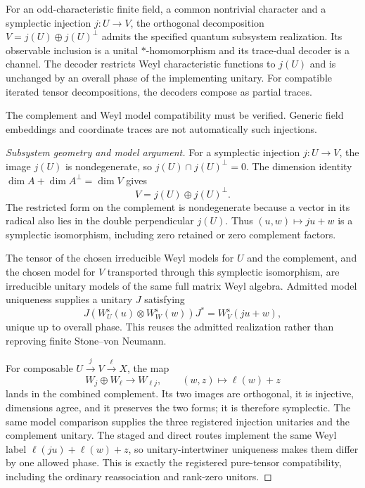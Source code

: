 \begin{proposition}
\statusProved{}
For an odd-characteristic finite field, a common nontrivial character and a
symplectic injection $j:U\to V$, the orthogonal decomposition $V=j(U)\oplus
j(U)^\perp$ admits the specified quantum subsystem realization. Its observable
inclusion is a unital $*$-homomorphism and its trace-dual decoder is a channel. The
decoder restricts Weyl characteristic functions to $j(U)$ and is unchanged by an
overall phase of the implementing unitary. For compatible iterated tensor
decompositions, the decoders compose as partial traces.
\end{proposition}
\begin{scope}
The complement and Weyl model compatibility must be verified. Generic field embeddings and coordinate traces are not automatically such injections.
\end{scope}

\begin{proof}[Subsystem geometry and model argument]
For a symplectic injection $j:U\to V$, the image $j(U)$ is nondegenerate,
so $j(U)\cap j(U)^\perp=0$. The dimension identity
$\dim A+\dim A^\perp=\dim V$ gives
\[
 V=j(U)\oplus j(U)^\perp.
\]
The restricted form on the complement is nondegenerate because a vector in
its radical also lies in the double perpendicular $j(U)$. Thus
$(u,w)\mapsto ju+w$ is a symplectic isomorphism, including zero retained or
zero complement factors.

The tensor of the chosen irreducible Weyl models for $U$ and the complement,
and the chosen model for $V$ transported through this symplectic
isomorphism, are irreducible unitary models of the same full matrix Weyl
algebra. Admitted model uniqueness supplies a unitary $J$ satisfying
\[
 J(W_U^{\mathrm s}(u)\otimes W_W^{\mathrm s}(w))J^*
 =W_V^{\mathrm s}(ju+w),
\]
unique up to overall phase. This reuses the admitted realization rather than
reproving finite Stone--von Neumann.

For composable $U\xrightarrow{j}V\xrightarrow{\ell}X$, the map
\[
 W_j\oplus W_\ell\longrightarrow W_{\ell j},
 \qquad(w,z)\longmapsto\ell(w)+z
\]
lands in the combined complement. Its two images are orthogonal, it is
injective, dimensions agree, and it preserves the two forms; it is therefore
symplectic. The same model comparison supplies the three registered
injection unitaries and the complement unitary. The staged and direct routes
implement the same Weyl label
$\ell(ju)+\ell(w)+z$, so unitary-intertwiner uniqueness makes them differ by
one allowed phase. This is exactly the registered pure-tensor compatibility,
including the ordinary reassociation and rank-zero unitors.
\end{proof}

